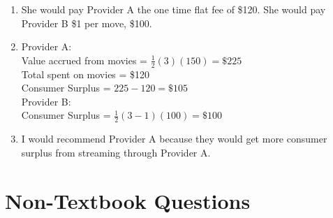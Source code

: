 \documentclass{article}
\begin{document}
\begin{enumerate}
\begin{enumerate}
		Provider A: $Q_D = 150 - 50(0) = 150$\\ 
		Provider B: $Q_D = 150 - 50(1) = 100$
	
	\item She would pay Provider A the one time flat fee of \$120. She would pay Provider B \$1 per move, \$100.
	
	\item Provider A: \\
		Value accrued from movies = $\frac{1}{2}(3)(150) = \$225$ \\
		Total spent on movies = \$120 \\
		Consumer Surplus = $225 - 120 = \$105$ \\
		Provider B: \\
		Consumer Surplus = $\frac{1}{2}(3 - 1)(100) = \$100$
	
	\item I would recommend Provider A because they would get more consumer surplus from streaming through Provider A.
	
	\end{enumerate}

\end{enumerate}

\section*{Non-Textbook Questions}
\end{document}
